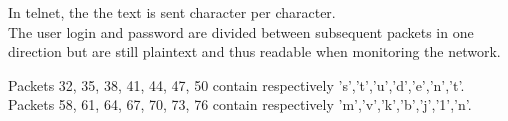 In telnet, the the text is sent character per character.\\
The user login and password are divided between subsequent packets in one direction but are still plaintext and thus readable when monitoring the network.

Packets 32, 35, 38, 41, 44, 47, 50 contain respectively 's','t','u','d','e','n','t'.\\

Packets 58, 61, 64, 67, 70, 73, 76 contain respectively 'm','v','k','b','j','1','n'.\\